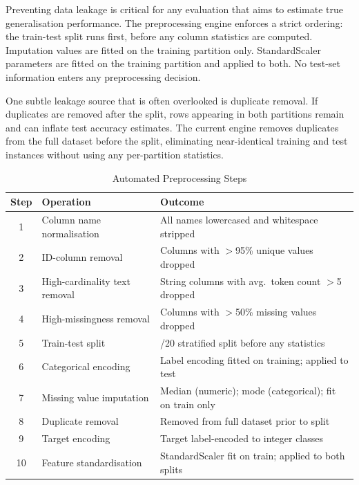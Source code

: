 \documentclass[conference]{IEEEtran}
\begin{document}
Preventing data leakage is critical for any evaluation that aims to estimate true generalisation performance. The preprocessing engine enforces a strict ordering: the train-test split runs first, before any column statistics are computed. Imputation values are fitted on the training partition only. StandardScaler parameters are fitted on the training partition and applied to both. No test-set information enters any preprocessing decision.

One subtle leakage source that is often overlooked is duplicate removal. If duplicates are removed after the split, rows appearing in both partitions remain and can inflate test accuracy estimates. The current engine removes duplicates from the full dataset before the split, eliminating near-identical training and test instances without using any per-partition statistics.

\begin{table}[t]
    \caption{Automated Preprocessing Steps}
    \label{tab:preprocessing}
    \centering
    \small
    \renewcommand{\arraystretch}{1.3}
    \begin{tabular}{|c|>{\raggedright\arraybackslash}p{1.4in}|>{\raggedright\arraybackslash}p{1.4in}|}
    \hline
    \textbf{Step} & \textbf{Operation} & \textbf{Outcome} \\
    \hline
    1 & Column name normalisation & All names lowercased and whitespace stripped \\
    \hline
    2 & ID-column removal & Columns with $>$95\% unique values dropped \\
    \hline
    3 & High-cardinality text removal & String columns with avg.\ token count $>$5 dropped \\
    \hline
    4 & High-missingness removal & Columns with $>$50\% missing values dropped \\
    \hline
    5 & Train-test split & 80/20 stratified split before any statistics \\
    \hline
    6 & Categorical encoding & Label encoding fitted on training; applied to test \\
    \hline
    7 & Missing value imputation & Median (numeric); mode (categorical); fit on train only \\
    \hline
    8 & Duplicate removal & Removed from full dataset prior to split \\
    \hline
    9 & Target encoding & Target label-encoded to integer classes \\
    \hline
    10 & Feature standardisation & StandardScaler fit on train; applied to both splits \\
    \hline
    \end{tabular}
\end{table}
\end{document}
